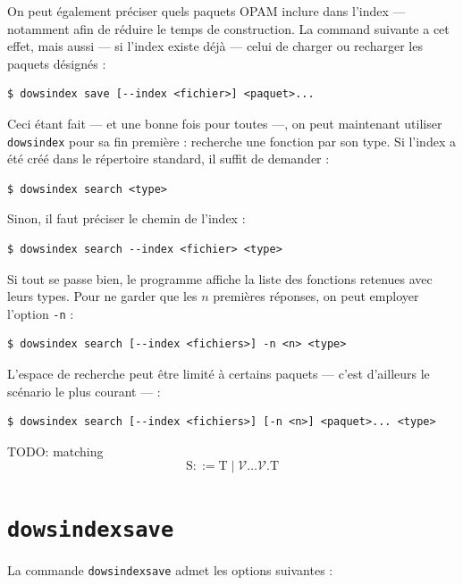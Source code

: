 \documentclass[a4paper]{report}
\theoremstyle{definition}
\newcommand{\dowsindex}{\texttt{dowsindex}\xspace}
\newcommand{\V}{\mathscr{V}}
\newcommand{\T}{\mathrm{T}}
\begin{document}
On peut également préciser quels paquets OPAM inclure dans l'index — notamment afin de réduire le temps de construction. La command suivante a cet effet, mais aussi — si l'index existe déjà — celui de charger ou recharger les paquets désignés :

\begin{verbatim}
$ dowsindex save [--index <fichier>] <paquet>...
\end{verbatim}

Ceci étant fait — et une bonne fois pour toutes —, on peut maintenant utiliser \dowsindex pour sa fin première : recherche une fonction par son type. Si l'index a été créé dans le répertoire standard, il suffit de demander :

\begin{verbatim}
$ dowsindex search <type>
\end{verbatim}

Sinon, il faut préciser le chemin de l'index :

\begin{verbatim}
$ dowsindex search --index <fichier> <type>
\end{verbatim}

Si tout se passe bien, le programme affiche la liste des fonctions retenues avec leurs types. Pour ne garder que les $n$ premières réponses, on peut employer l'option \texttt{-n} :

\begin{verbatim}
$ dowsindex search [--index <fichiers>] -n <n> <type>
\end{verbatim}

L'espace de recherche peut être limité à certains paquets — c'est d'ailleurs le scénario le plus courant — :

\begin{verbatim}
$ dowsindex search [--index <fichiers>] [-n <n>] <paquet>... <type>
\end{verbatim}

TODO: matching
\[ \mathrm{S} ::= \T \mid \V \dots \V . \T \]


\section{\dowsindex \texttt{save}}

La commande \dowsindex \texttt{save} admet les options suivantes :
\end{document}
